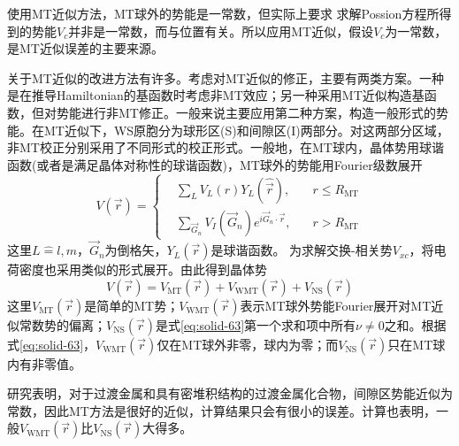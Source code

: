 使用MT近似方法，MT球外的势能是一常数，但实际上要求%
求解Possion方程所得到的势能$V_c$并非是一常数，而与位置有关。所以应用MT近似，假设$V_c$为一常数，是MT近似误差的主要来源。

关于MT近似的改进方法有许多\cite{RPP44-139_1981}。考虑对MT近似的修正，主要有两类方案。一种是在推导Hamiltonian的基函数时考虑非MT效应；另一种采用MT近似构造基函数，但对势能进行非MT修正。一般来说主要应用第二种方案，构造一般形式的势能。在MT近似下，WS原胞分为球形区(S)和间隙区(I)两部分。对这两部分区域，非MT校正分别采用了不同形式的校正形式。一般地，在MT球内，晶体势用球谐函数(或者是满足晶体对称性的球谐函数)，MT球外的势能用Fourier级数展开\cite{PRB13-5362_1976}
\begin{equation}
  V(\vec r)=\left\{
  \begin{aligned}
	  &\sum_LV_L(r)Y_L(\hat{\vec r}),\quad &r\leqslant R_{\mathrm{MT}}\\
	  &\sum_{\vec G_n}V_I(\vec G_n)e^{i\vec G_n\cdot\vec r},&r>R_{\mathrm{MT}}
  \end{aligned}\right.
  \label{eq:solid-63}
\end{equation}
这里$L\hat=l,m$，$\vec G_n$为倒格矢，$Y_L(\vec r)$是球谐函数。%
为求解交换-相关势$V_{xc}$，将电荷密度也采用类似的形式展开。由此得到晶体势
\begin{equation}
	V(\vec r)=V_{\mathrm{MT}}(\vec r)+V_{\mathrm{WMT}}(\vec r)+V_{\mathrm{NS}}(\vec r)
  \label{eq:solid-64}
\end{equation}
这里$V_{\mathrm{MT}}(\vec r)$是简单的MT势；$V_{\mathrm{WMT}}(\vec r)$表示MT球外势能Fourier展开对MT近似常数势的偏离；$V_{\mathrm{NS}}(\vec r)$是式\eqref{eq:solid-63}第一个求和项中所有$\nu$$\neq$0之和。根据式\eqref{eq:solid-63}，$V_{\mathrm{WMT}}(\vec r)$仅在MT球外非零，球内为零；而$V_{\mathrm{NS}}(\vec r)$只在MT球内有非零值。

研究表明，对于过渡金属和具有密堆积结构的过渡金属化合物，间隙区势能近似为常数，因此MT方法是很好的近似，计算结果只会有很小的误差\cite{PR153-931_1967,PRB1-1318_1970,PLA33-414_1970}。计算也表明，一般$V_{\mathrm{WMT}}(\vec r)$比$V_{\mathrm{NS}}(\vec r)$大得多。

